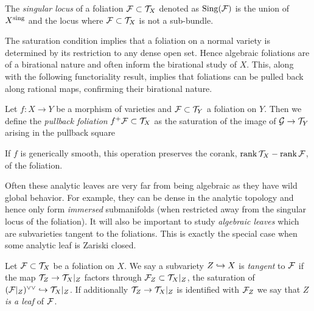 \documentclass[main.tex]{subfiles}
\begin{document}
\begin{defn}
The \textit{singular locus} of a foliation $\mathcal{F} \subset \mathcal{T}_X$ denoted as $\operatorname{\mathrm{Sing}}(\mathcal{F})$ is the union of $X^{\mathrm{sing}}$ and the locus where $\mathcal{F} \subset \mathcal{T}_X$ is not a sub-bundle. 
\end{defn}

The saturation condition implies that a foliation on a normal variety is determined by its restriction to any dense open set. Hence algebraic foliations are of a birational nature and often inform the birational study of $X$. This, along with the following functoriality result, implies that foliations can be pulled back along rational maps, confirming their birational nature.

\begin{defn} \label{defn:pullback_foliation}
Let $f : X \to Y$ be a morphism of varieties and $\mathcal{F} \subset \mathcal{T}_{Y}$ a foliation on $Y$. Then we define the \textit{pullback foliation} $f^+ \mathcal{F} \subset \mathcal{T}_X$ as the saturation of the image of $\mathcal{G} \to \mathcal{T}_Y$ arising in the pullback square
\begin{center}
\end{center} 
\end{defn}

If $f$ is generically smooth, this operation preserves the corank, $\operatorname{\mathrm{rank}}{\mathcal{T}_X} - \operatorname{\mathrm{rank}}{\mathcal{F}}$, of the foliation. 
\par 
Often these analytic leaves are very far from being algebraic as they have wild global behavior. For example, they can be dense in the analytic topology and hence only form \textit{immersed} submanifolds (when restricted away from the singular locus of the foliation). It will also be important to study \textit{algebraic leaves} which are subvarieties tangent to the foliations. This is exactly the special case when some analytic leaf is Zariski closed. 

\begin{defn}
Let $\mathcal{F} \subset \mathcal{T}_X$ be a foliation on $X$. We say a subvariety $Z \hookrightarrow X$ is \textit{tangent} to $\mathcal{F}$  if the map $\mathcal{T}_Z \to \mathcal{T}_X |_Z$ factors through $\mathcal{F}_Z \subset \mathcal{T}_X|_Z$, the saturation of $(\mathcal{F}|_Z)^{\vee \vee} \hookrightarrow \mathcal{T}_X|_Z$. If additionally $\mathcal{T}_Z \to \mathcal{T}_X|_Z$ is identified with $\mathcal{F}_Z$ we say that $Z$ \textit{is a leaf} of $\mathcal{F}$.
\end{defn}
\end{document}
